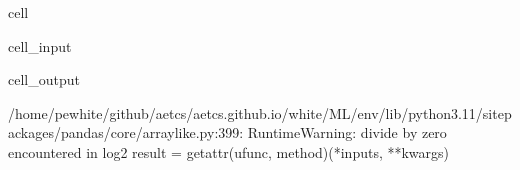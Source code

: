 \documentclass[letterpaper,10pt,english]{jupyterBook}
\begin{document}
\begin{sphinxuseclass}{cell}\begin{sphinxVerbatimInput}

\begin{sphinxuseclass}{cell_input}
\begin{sphinxVerbatim}[commandchars=\\\{\}]
   \PYG{p}{[}\PYG{p}{]} \PYG{p}{[}\PYG{p}{]}
\PYG{p}{[}\PYG{p}{]}  \PYG{p}{[}\PYG{p}{]}
\end{sphinxVerbatim}

\end{sphinxuseclass}\end{sphinxVerbatimInput}
\begin{sphinxVerbatimOutput}

\begin{sphinxuseclass}{cell_output}
\begin{sphinxVerbatim}[commandchars=\\\{\}]
/home/pewhite/github/aet\PYGZhy{}cs/aet\PYGZhy{}cs.github.io/white/ML/env/lib/python3.11/site\PYGZhy{}packages/pandas/core/arraylike.py:399: RuntimeWarning: divide by zero encountered in log2
  result = getattr(ufunc, method)(*inputs, **kwargs)
\end{sphinxVerbatim}

\end{sphinxuseclass}\end{sphinxVerbatimOutput}

\end{sphinxuseclass}
\end{document}
